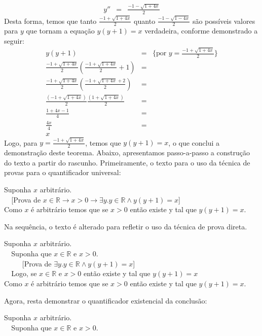 \begin{Example}
\[\begin{array}{lcl}
y'' & = & \frac{-1 - \sqrt{1 + 4x}}{2}
\end{array}
\]
Desta forma, temos que tanto $\frac{-1 + \sqrt{1 + 4x}}{2}$ quanto
$\frac{-1 - \sqrt{1 - 4x}}{2}$ são possíveis valores para $y$ que
tornam a equação $y(y+1) = x$ verdadeira, conforme demonstrado a
seguir:
\[
\begin{array}{lcl}
y(y+1) & = &\{\text{por }y = \frac{-1 + \sqrt{1 + 4x}}{2}\}\\
\frac{-1 + \sqrt{1 + 4x}}{2}\left(\frac{-1 + \sqrt{1 + 4x}}{2} +
  1\right) & = &\\
\frac{-1 + \sqrt{1 + 4x}}{2}\left(\frac{-1 + \sqrt{1 + 4x} + 2}{2}
\right) & = \\
\frac{(-1 + \sqrt{1 + 4x})}{2}\frac{(1 + \sqrt{1 + 4x})}{2} & =\\
\frac{1 + 4x - 1}{4} & =\\
\frac{4x}{4} & = \\
x
\end{array}
\]
Logo, para $y = \frac{-1 + \sqrt{1 + 4x}}{2}$, temos que $y(y+1) = x$,
o que conclui a demonstração deste teorema. Abaixo, apresentamos
passo-a-passo a construção do texto a partir do
rascunho. Primeiramente, o texto para o uso da técnica de provas para
o quantificador universal:
\begin{flushleft}
Suponha $x$ arbitrário.\\
\verb|  |[Prova de $x\in\mathbb{R}\to x > 0 \to \exists
y.y\in\mathbb{R}\land y(y + 1) = x$]\\
Como $x$ é arbitrário temos que se $x > 0$ então existe y tal que
$y(y+1) = x$.
\end{flushleft}
Na sequência, o texto é alterado para refletir o uso da técnica de
prova direta.
\begin{flushleft}
Suponha $x$ arbitrário.\\
\verb|  |Suponha que $x \in \mathbb{R}$ e $x> 0$.\\
\verb|     |[Prova de $\exists y.y\in\mathbb{R}\land y(y + 1) = x$]\\
\verb|  |Logo, se $x \in \mathbb{R}$ e $x> 0$ então existe y tal que
$y(y+1) = x$\\
Como $x$ é arbitrário temos que se $x > 0$ então existe y tal que
$y(y+1) = x$.
\end{flushleft}
Agora, resta demonstrar o quantificador existencial da conclusão:
\begin{flushleft}
Suponha $x$ arbitrário.\\
\verb|  |Suponha que $x \in \mathbb{R}$ e $x> 0$.\\

\end{flushleft}
\end{Example}

